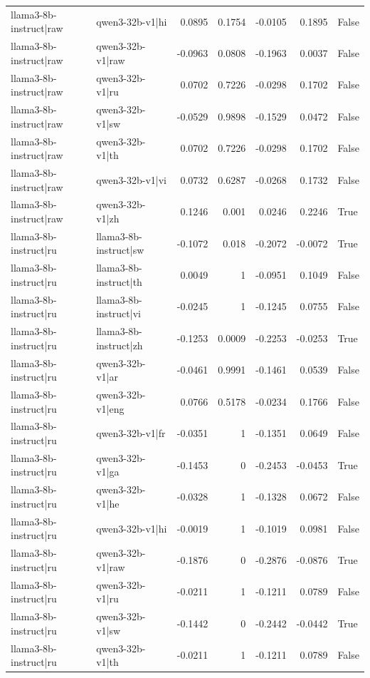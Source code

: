 \begin{table}
\begin{tabular}{l l r r r r l}
llama3-8b-instruct|raw & qwen3-32b-v1|hi & 0.0895 & 0.1754 & -0.0105 & 0.1895 & False \\
llama3-8b-instruct|raw & qwen3-32b-v1|raw & -0.0963 & 0.0808 & -0.1963 & 0.0037 & False \\
llama3-8b-instruct|raw & qwen3-32b-v1|ru & 0.0702 & 0.7226 & -0.0298 & 0.1702 & False \\
llama3-8b-instruct|raw & qwen3-32b-v1|sw & -0.0529 & 0.9898 & -0.1529 & 0.0472 & False \\
llama3-8b-instruct|raw & qwen3-32b-v1|th & 0.0702 & 0.7226 & -0.0298 & 0.1702 & False \\
llama3-8b-instruct|raw & qwen3-32b-v1|vi & 0.0732 & 0.6287 & -0.0268 & 0.1732 & False \\
llama3-8b-instruct|raw & qwen3-32b-v1|zh & 0.1246 & 0.001 & 0.0246 & 0.2246 & True \\
llama3-8b-instruct|ru & llama3-8b-instruct|sw & -0.1072 & 0.018 & -0.2072 & -0.0072 & True \\
llama3-8b-instruct|ru & llama3-8b-instruct|th & 0.0049 & 1 & -0.0951 & 0.1049 & False \\
llama3-8b-instruct|ru & llama3-8b-instruct|vi & -0.0245 & 1 & -0.1245 & 0.0755 & False \\
llama3-8b-instruct|ru & llama3-8b-instruct|zh & -0.1253 & 0.0009 & -0.2253 & -0.0253 & True \\
llama3-8b-instruct|ru & qwen3-32b-v1|ar & -0.0461 & 0.9991 & -0.1461 & 0.0539 & False \\
llama3-8b-instruct|ru & qwen3-32b-v1|eng & 0.0766 & 0.5178 & -0.0234 & 0.1766 & False \\
llama3-8b-instruct|ru & qwen3-32b-v1|fr & -0.0351 & 1 & -0.1351 & 0.0649 & False \\
llama3-8b-instruct|ru & qwen3-32b-v1|ga & -0.1453 & 0 & -0.2453 & -0.0453 & True \\
llama3-8b-instruct|ru & qwen3-32b-v1|he & -0.0328 & 1 & -0.1328 & 0.0672 & False \\
llama3-8b-instruct|ru & qwen3-32b-v1|hi & -0.0019 & 1 & -0.1019 & 0.0981 & False \\
llama3-8b-instruct|ru & qwen3-32b-v1|raw & -0.1876 & 0 & -0.2876 & -0.0876 & True \\
llama3-8b-instruct|ru & qwen3-32b-v1|ru & -0.0211 & 1 & -0.1211 & 0.0789 & False \\
llama3-8b-instruct|ru & qwen3-32b-v1|sw & -0.1442 & 0 & -0.2442 & -0.0442 & True \\
llama3-8b-instruct|ru & qwen3-32b-v1|th & -0.0211 & 1 & -0.1211 & 0.0789 & False \\

\end{tabular}
\end{table}
